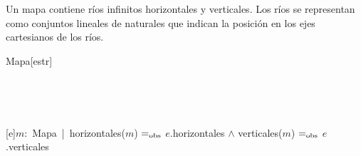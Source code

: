 \begin{Representacion}
  
  
    Un mapa contiene ríos infinitos horizontales y verticales. Los ríos se
    representan como conjuntos lineales de naturales que indican la posición en
    los ejes cartesianos de los ríos.
  
    \begin{Estructura}{Mapa}[estr]
      \begin{Tupla}[estr]
      \end{Tupla}
  
    \end{Estructura}
    
    ~ 

  
    ~ 
  
    [e]{$m$:\ Mapa\ |\ 
        horizontales($m$) $=_{\mathrm{obs}}$ $e$.horizontales $\land$ 
        verticales($m$) $=_{\mathrm{obs}}$ $e$.verticales 
    }
  
  \end{Representacion}